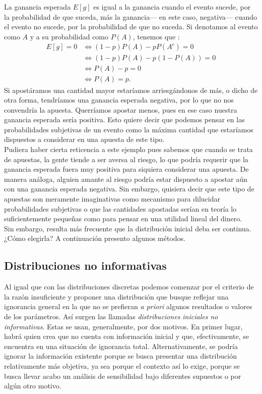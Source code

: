 La ganancia esperada $E[g]$ es igual a la ganancia cuando el evento sucede, por la probabilidad de que suceda, más la ganancia--- en este caso, negativa--- cuando el evento no sucede, por la probabilidad de que no suceda. Si denotamos al evento como $A$ y a su probabilidad como $P(A)$, tenemos que : 
\begin{align*}
E[g] = 0 &\Leftrightarrow (1-p)P(A) - pP(A^c) = 0 \\
&\Leftrightarrow (1-p)P(A) - p(1-P(A))= 0\\ 
&\Leftrightarrow P(A) - p = 0\\
&\Leftrightarrow P(A) = p.
\end{align*}
Si apostáramos una cantidad mayor estaríamos arriesgándonos de más, o dicho de otra forma, tendríamos una ganancia esperada negativa, por lo que no nos convendría la apuesta. Querríamos apostar menos, pues en ese caso nuestra ganancia esperada sería positiva. Esto quiere decir que podemos pensar en las probabilidades subjetivas de un evento como la máxima cantidad que estaríamos dispuestos a considerar en una apuesta de este tipo.\\ 

Pudiera haber cierta reticencia a este ejemplo pues sabemos que cuando se trata de apuestas, la gente tiende a ser aversa al riesgo, lo que podría requerir que la ganancia esperada fuera muy positiva para siquiera considerar una apuesta. De manera análoga, alguien amante al riesgo podría estar dispuesto a apostar aún con una ganancia esperada negativa. Sin embargo, quisiera decir que este tipo de apuestas son meramente imaginativas como mecanismo para dilucidar probabilidades subjetivas o que las cantidades apostadas serían en teoría lo suficientemente pequeñas como para pensar en una utilidad lineal del dinero.\\ 

Sin embargo, resulta más frecuente que la distribución inicial deba ser continua. ¿Cómo elegirla? A continuación presento algunos métodos.  

\subsection{Distribuciones no informativas}

Al igual que con las distribuciones discretas podemos comenzar por el criterio de la razón insuficiente y proponer una distribución que busque reflejar una ignorancia general en la que no se prefieran \textit{a priori} algunos resultados o valores de los parámetros. Así surgen las llamadas \textit{distribuciones iniciales no informativas}. Estas se usan, generalmente, por dos motivos. En primer lugar, habrá quien crea que no cuenta con información inicial y que, efectivamente, se encuentra en una situación de ignorancia total. Alternativamente, se podría ignorar la información existente porque se busca presentar una distribución relativamente más objetiva, ya sea porque el contexto así lo exige, porque se busca llevar acabo un análisis de sensibilidad bajo diferentes supuestos o por algún otro motivo.\\ 

